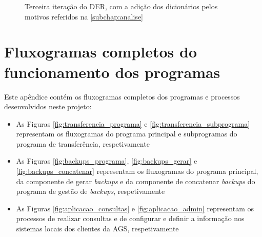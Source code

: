 \documentclass[11pt,twoside,a4paper]{report}
\begin{document}
\begin{landscape}
\begin{figure}
\begin{center}
		\caption[Terceira iteração do Diagrama Entidade/Relação]{Terceira iteração do DER, com a adição dos dicionários pelos motivos referidos na \autoref{subchap:analise}}
		\label{fig:evolucao_der3}
	\end{center}
\end{figure}
\end{landscape}

\cleardoublepage
\chapter{Fluxogramas completos do funcionamento dos programas}
\label{apen:fluxogramas}
Este apêndice contém os fluxogramas completos dos programas e processos desenvolvidos neste projeto:
\begin{itemize}
	\item As Figuras \ref{fig:transferencia_programa} e \ref{fig:transferencia_subprograma} representam os fluxogramas do programa principal e subprogramas do programa de transferência, respetivamente
	\item As Figuras \ref{fig:backups_programa}, \ref{fig:backups_gerar} e \ref{fig:backups_concatenar} representam os fluxogramas do programa principal, da componente de gerar \textit{backups} e da componente de concatenar \textit{backups} do programa de gestão de \textit{backups}, respetivamente
	\item As Figuras \ref{fig:aplicacao_consultas} e \ref{fig:aplicacao_admin} representam os processos de realizar consultas e de configurar e definir a informação nos sistemas locais dos clientes da AGS, respetivamente
\end{itemize}
\end{document}
